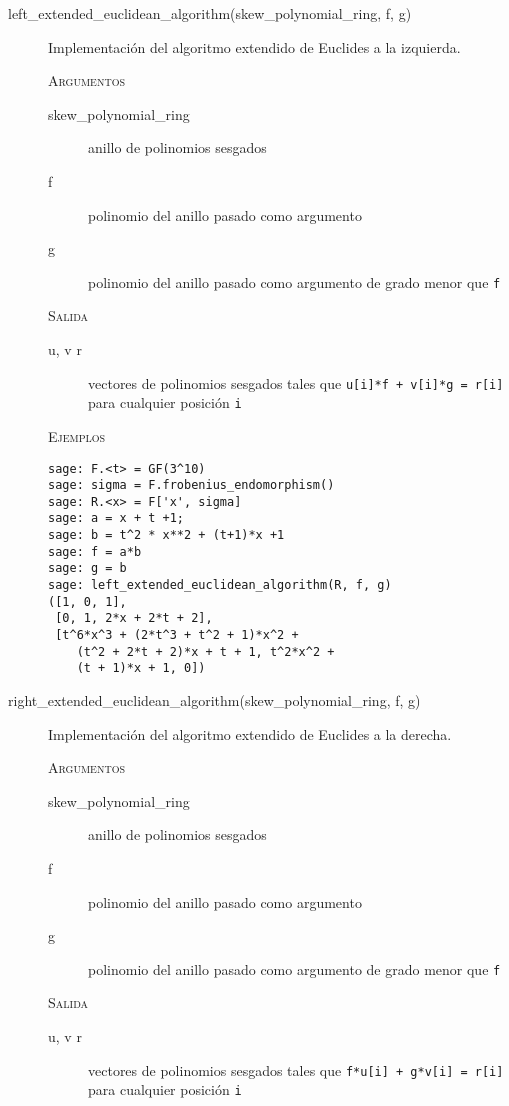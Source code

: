 \begin{description}
    \item[left\_extended\_euclidean\_algorithm(skew\_polynomial\_ring, f, g)]

    Implementación del algoritmo extendido de Euclides a la izquierda.

    \textsc{Argumentos}
    \begin{description}
        \item[skew\_polynomial\_ring] anillo de polinomios sesgados
        \item[f] polinomio del anillo pasado como argumento
        \item[g] polinomio del anillo pasado como argumento de grado menor que \texttt{f}
    \end{description}

    \textsc{Salida}
    \begin{description}
        \item[u, v r] vectores de polinomios sesgados tales que \texttt{u[i]*f + v[i]*g = r[i]} para cualquier posición \texttt{i}
    \end{description}

    \textsc{Ejemplos}
    \begin{lstlisting}
sage: F.<t> = GF(3^10)
sage: sigma = F.frobenius_endomorphism()
sage: R.<x> = F['x', sigma]
sage: a = x + t +1;
sage: b = t^2 * x**2 + (t+1)*x +1
sage: f = a*b
sage: g = b
sage: left_extended_euclidean_algorithm(R, f, g)
([1, 0, 1],
 [0, 1, 2*x + 2*t + 2],
 [t^6*x^3 + (2*t^3 + t^2 + 1)*x^2 +
    (t^2 + 2*t + 2)*x + t + 1, t^2*x^2 +
    (t + 1)*x + 1, 0])
    \end{lstlisting}

    \item[right\_extended\_euclidean\_algorithm(skew\_polynomial\_ring, f, g)]

    Implementación del algoritmo extendido de Euclides a la derecha.

    \textsc{Argumentos}
    \begin{description}
        \item[skew\_polynomial\_ring] anillo de polinomios sesgados
        \item[f] polinomio del anillo pasado como argumento
        \item[g] polinomio del anillo pasado como argumento de grado menor que \texttt{f}
    \end{description}

    \textsc{Salida}
    \begin{description}
        \item[u, v r] vectores de polinomios sesgados tales que \texttt{f*u[i] + g*v[i] = r[i]} para cualquier posición \texttt{i}
    \end{description}


\end{description}
